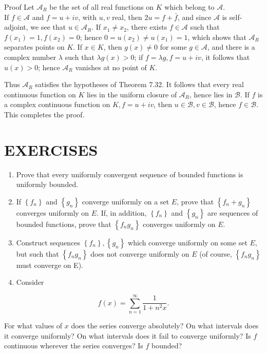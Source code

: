 \documentclass[10pt]{article}
\begin{document}
Proof Let $\mathscr{A}_{R}$ be the set of all real functions on $K$ which belong to $\mathscr{A}$.\\
If $f \in \mathscr{A}$ and $f=u+i v$, with $u, v$ real, then $2 u=f+\bar{f}$, and since $\mathscr{A}$ is self-adjoint, we see that $u \in \mathscr{A}_{R}$. If $x_{1} \neq x_{2}$, there exists $f \in \mathscr{A}$ such that $f\left(x_{1}\right)=1, f\left(x_{2}\right)=0$; hence $0=u\left(x_{2}\right) \neq u\left(x_{1}\right)=1$, which shows that $\mathscr{A}_{R}$ separates points on $K$. If $x \in K$, then $g(x) \neq 0$ for some $g \in \mathscr{A}$, and there is a complex number $\lambda$ such that $\lambda g(x)>0$; if $f=\lambda g, f=u+i v$, it follows that $u(x)>0$; hence $\mathscr{A}_{R}$ vanishes at no point of $K$.

Thus $\mathscr{A}_{R}$ satisfies the hypotheses of Theorem 7.32. It follows that every real continuous function on $K$ lies in the uniform closure of $\mathscr{A}_{R}$, hence lies in $\mathscr{B}$. If $f$ is a complex continuous function on $K, f=u+i v$, then $u \in \mathscr{B}, v \in \mathscr{B}$, hence $f \in \mathscr{B}$. This completes the proof.

\section*{EXERCISES}
\begin{enumerate}
  \item Prove that every uniformly convergent sequence of bounded functions is uniformly bounded.
  \item If $\left\{f_{n}\right\}$ and $\left\{g_{n}\right\}$ converge uniformly on a set $E$, prove that $\left\{f_{n}+g_{n}\right\}$ converges uniformly on $E$. If, in addition, $\left\{f_{n}\right\}$ and $\left\{g_{n}\right\}$ are sequences of bounded functions, prove that $\left\{f_{n} g_{n}\right\}$ converges uniformly on $E$.
  \item Construct sequences $\left\{f_{n}\right\},\left\{g_{n}\right\}$ which converge uniformly on some set $E$, but such that $\left\{f_{n} g_{n}\right\}$ does not converge uniformly on $E$ (of course, $\left\{f_{n} g_{n}\right\}$ must converge on E).
  \item Consider
\end{enumerate}

$$
f(x)=\sum_{n=1}^{\infty} \frac{1}{1+n^{2} x} .
$$

For what values of $x$ does the series converge absolutely? On what intervals does it converge uniformly? On what intervals does it fail to converge uniformly? Is $f$ continuous wherever the series converges? Is $f$ bounded?
\end{document}

